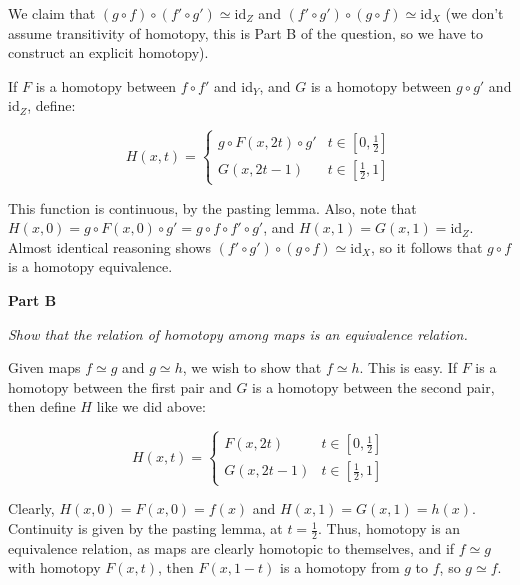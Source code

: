 \documentclass[10pt, oneside]{amsart}
\begin{document}
    We claim that $(g \circ f) \circ (f' \circ g') \simeq \text{id}_{Z}$ and $(f' \circ g') \circ (g \circ f) \simeq \text{id}_{X}$ (we don't assume transitivity of homotopy, this is Part B of the question, so we have to
    construct an explicit homotopy).
    \newline

    If $F$ is a homotopy between $f \circ f'$ and $\text{id}_{Y}$, and $G$ is a homotopy between $g \circ g'$ and $\text{id}_{Z}$, define:

    $$H(x, t) = \begin{cases}
      g \circ F(x, 2t) \circ g' & t \in \left[0, \frac{1}{2} \right] \\
      G(x, 2t - 1) & t \in \left[\frac{1}{2}, 1 \right]
    \end{cases}
    $$

    This function is continuous, by the pasting lemma. Also, note that $H(x, 0) = g \circ F(x, 0) \circ g' = g \circ f \circ f' \circ g'$, and $H(x, 1) = G(x, 1) = \text{id}_{Z}$. Almost identical
    reasoning shows $(f' \circ g') \circ (g \circ f) \simeq \text{id}_{X}$, so it follows that $g \circ f$ is a homotopy equivalence.
    \newline

    \textbf{Part B}
    \newline

    \textit{Show that the relation of homotopy among maps is an equivalence relation.}
    \newline

    Given maps $f \simeq g$ and $g \simeq h$, we wish to show that $f \simeq h$. This is easy. If $F$ is a homotopy between the first pair and $G$ is a homotopy between the second pair, then define $H$ like we did above:

    $$H(x, t) = \begin{cases}
      F(x, 2t) & t \in \left[ 0, \frac{1}{2} \right] \\
      G(x, 2t - 1) & t \in \left[ \frac{1}{2}, 1 \right]
    \end{cases}
    $$

    Clearly, $H(x, 0) = F(x, 0) = f(x)$ and $H(x, 1) = G(x, 1) = h(x)$. Continuity is given by the pasting lemma, at $t = \frac{1}{2}$. Thus, homotopy is an equivalence relation, as maps are clearly homotopic to
    themselves, and if $f \simeq g$ with homotopy $F(x, t)$, then $F(x, 1 - t)$ is a homotopy from $g$ to $f$, so $g \simeq f$.
    \newline
\end{document}
